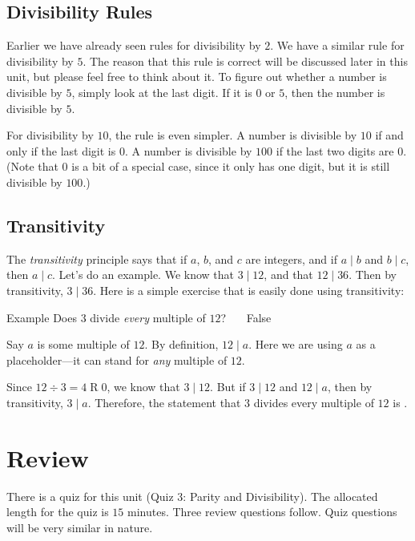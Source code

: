 \documentclass[a4paper,10pt]{report}
\begin{document}
\subsection{Divisibility Rules}

Earlier we have already seen rules for divisibility by $2$. We have a similar
rule for divisibility by $5$. The reason that this rule is correct will be
discussed later in this unit, but please feel free to think about it. To figure
out whether a number is divisible by $5$, simply look at the last digit. If it
is $0$ or $5$, then the number is divisible by $5$.

For divisibility by $10$, the rule is even simpler. A number is divisible by
$10$ if and only if the last digit is $0$. A number is divisible by $100$ if the
last two digits are $0$. (Note that $0$ is a bit of a special case, since it
only has one digit, but it is still divisible by $100$.)

\subsection{Transitivity}

The \emph{transitivity} principle says that if $a$, $b$, and $c$ are integers,
and if $a \mid b$ and $b \mid c$, then $a \mid c$. Let's do an example. We know
that $3 \mid 12$, and that $12 \mid 36$. Then by transitivity, $3 \mid 36$. Here
is a simple exercise that is easily done using transitivity:

\begin{problem}{Example}
 Does $3$ divide \emph{every} multiple of $12$? \hfill {}~~~False

 \begin{solution}
  Say $a$ is some multiple of $12$. By definition, $12 \mid a$. Here we are
  using $a$ as a placeholder---it can stand for \emph{any} multiple of $12$.

  Since $12 \div 3 = 4 \operatorname{R} 0$, we know that $3 \mid 12$. But if $3
  \mid 12$ and $12 \mid a$, then by transitivity, $3 \mid a$. Therefore, the
  statement that $3$ divides every multiple of $12$ is .
 \end{solution}
\end{problem}

\section{Review}

There is a quiz for this unit (Quiz 3: Parity and Divisibility). The allocated
length for the quiz is $15$ minutes. Three review questions follow. Quiz
questions will be very similar in nature.
\end{document}
